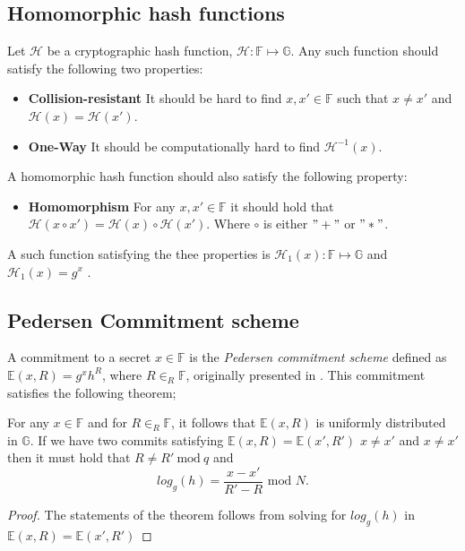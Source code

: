 \subsection*{Homomorphic hash functions}
Let $\mathcal{H}$ be a cryptographic hash function, $\mathcal{H}:\mathds{F}\mapsto \mathds{G}$. Any such function should satisfy the following two properties:
\begin{itemize}
    \item \textbf{Collision-resistant} It should be hard to find $x,x'\in\mathds{F}$ such that $x\neq x'$ and $\mathcal{H}(x)=\mathcal{H}(x')$.
    \item \textbf{One-Way} It should be computationally hard to find $\mathcal{H}^{-1}(x)$.
\end{itemize}

A homomorphic hash function should also satisfy the following property:
\begin{itemize}
    \item \textbf{Homomorphism} For any $x,x'\in\mathds{F}$ it should hold that $\mathcal{H}(x\circ x') = \mathcal{H}(x)\circ\mathcal{H}(x')$. Where $\circ$ is either $"+"$ or $"*"$.
\end{itemize}

A such function satisfying the thee properties is $\mathcal{H}_1(x):\mathds{F}\mapsto\mathds{G}$ and $\mathcal{H}_1(x)= g^{x}$ \cite{HHF}. 


\subsection*{Pedersen Commitment scheme}
A commitment to a secret $x\in\mathds{F}$ is the \textit{Pedersen commitment scheme} defined as $\mathds{E}(x,R)=g^xh^R$, where $R\in_R\mathds{F}$,  originally presented in \cite{pedersen}. This commitment satisfies the following theorem;
\\
\begin{thm}
\label{thm:C=g^xh^R}
For any $x\in\mathds{F}$ and for $R\in_R\mathds{F}$, it follows that   $\mathds{E}(x,R)$ is uniformly distributed in $\mathds{G}$. If we have two commits satisfying $\mathds{E}(x,R)=\mathds{E}(x',R')$  $x\neq x'$ and  $x\neq x'$ then it must hold that $R\neq R' \:\text{mod}\:q$ and 
\begin{equation}
\label{eq:pedersen_binidng}
    log_g(h) = \frac{x-x'}{R'-R} \text{ mod }N.
\end{equation}
\end{thm}
\begin{proof}
The statements of the theorem follows from solving for $log_g(h)$ in $\mathds{E}(x,R)=\mathds{E}(x',R')$ 
\end{proof}

